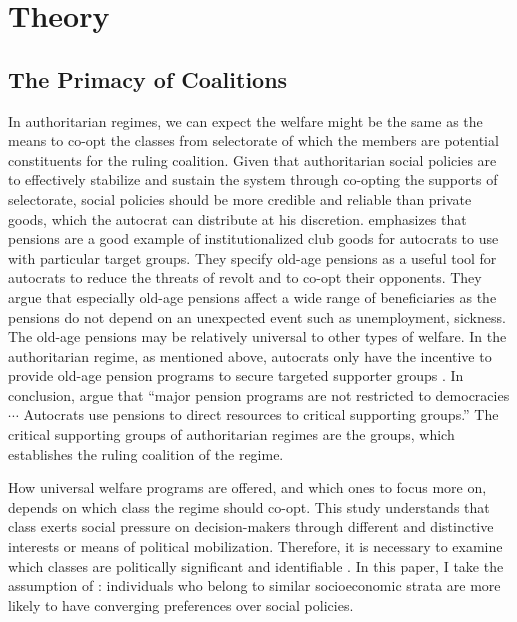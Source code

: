 \documentclass[11pt, notitlepage]{article}
\begin{document}
\section{Theory}
\subsection{The Primacy of Coalitions}

In authoritarian regimes, we can expect the welfare might be the same as the means to co-opt the classes from selectorate of which the members are potential constituents for the ruling coalition. Given that authoritarian social policies are to effectively stabilize and sustain the system through co-opting the supports of selectorate, social policies should be more credible and reliable than private goods, which the autocrat can distribute at his discretion. \citet{Knutsen2018} emphasizes that pensions are a good example of institutionalized club goods for autocrats to use with particular target groups. They specify old-age pensions as a useful tool for autocrats to reduce the threats of revolt and to co-opt their opponents. They argue that especially old-age pensions affect a wide range of beneficiaries as the pensions do not depend on an unexpected event such as unemployment, sickness. The old-age pensions may be relatively universal to other types of welfare. In the authoritarian regime, as mentioned above, autocrats only have the incentive to provide old-age pension programs to secure targeted supporter groups \citep[670]{Knutsen2018}. In conclusion, \citet[688]{Knutsen2018} argue that ``major pension programs are not restricted to democracies $\cdots$ Autocrats use pensions to direct resources to critical supporting groups.'' The critical supporting groups of authoritarian regimes are the groups, which establishes the ruling coalition of the regime.

How universal welfare programs are offered, and which ones to focus more on, depends on which class the regime should co-opt. This study understands that class exerts social pressure on decision-makers through different and distinctive interests or means of political mobilization. Therefore, it is necessary to examine which classes are politically significant and identifiable \citep{Bean1998}. In this paper, I take the assumption of \citet[1495]{Dahlum2019}: individuals who belong to similar socioeconomic strata are more likely to have converging preferences over social policies.
\end{document}
